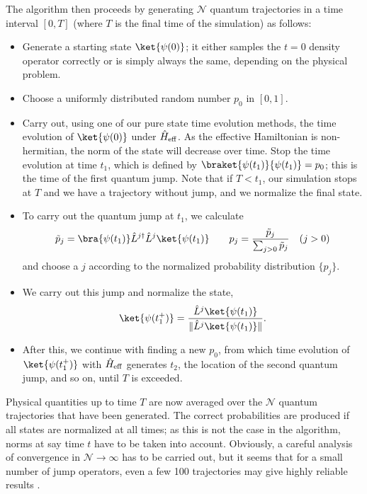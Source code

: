 The algorithm then proceeds by generating ${\mathcal N}$ quantum trajectories in a time interval $[0,T]$ (where $T$ is the final time of the simulation) as follows: 
\begin{itemize}
\item Generate a starting state $\ket{\psi(0)}$; it either samples the $t=0$ density operator correctly or is simply always the same, depending on the physical problem.
\item Choose a uniformly distributed random number $p_0$ in $[0,1]$.
\item Carry out, using one of our pure state time evolution methods, the time evolution of $\ket{\psi(0)}$ under $\hat{H}_{{\rm eff}}$. As the effective Hamiltonian is non-hermitian, the norm of the state will decrease over time. Stop the time evolution at time $t_1$, which is defined by 
$\braket{\psi(t_1)}{\psi(t_1)} = p_0$; this is the time of the first quantum jump. Note that if $T<t_1$, our simulation stops at $T$ and we have a trajectory without jump, and we normalize the final state.
\item To carry out the quantum jump at $t_1$, we calculate
\begin{equation}
\tilde{p}_j = \bra{\psi(t_1)} \hat{L}^{j\dagger} \hat{L}^j \ket{\psi(t_1)} \quad\quad p_j = \frac{\tilde{p}_j}{\sum_{j>0} \tilde{p}_j} \quad (j>0)
\end{equation}
and choose a $j$ according to the normalized probability distribution $\{ p_j \}$.
\item We carry out this jump and normalize the state,
\begin{equation}
\ket{\psi(t_1^+)} = \frac{\hat{L}^j \ket{\psi(t_1)}}{\| \hat{L}^j \ket{\psi(t_1)} \|} .
\end{equation}
\item After this, we continue with finding a new $p_0$, from which time evolution of $\ket{\psi(t_1^+)}$ with $\hat{H}_{{\rm eff}}$ generates $t_2$, the location of the second quantum jump, and so on, until $T$ is exceeded.
\end{itemize}
Physical quantities up to time $T$ are now averaged over the ${\mathcal N}$ quantum trajectories that have been generated. The correct probabilities are produced if all states are normalized at all times; as this is not the case in the algorithm, norms at say time $t$ have to be taken into account. Obviously, a careful analysis of convergence in ${\mathcal N} \rightarrow \infty$ has to be carried out, but it seems that for a small number of jump operators, even a few 100 trajectories may give highly reliable results \cite{Daley09}.

